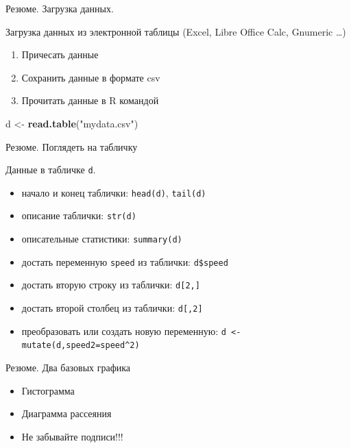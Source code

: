 \documentclass[ignorenonframetext,]{beamer}
\newenvironment{Shaded}{\begin{snugshade}}{\end{snugshade}}
\newcommand{\KeywordTok}[1]{\textcolor[rgb]{0.13,0.29,0.53}{\textbf{{#1}}}}
\newcommand{\StringTok}[1]{\textcolor[rgb]{0.31,0.60,0.02}{{#1}}}
\newcommand{\NormalTok}[1]{{#1}}
\begin{document}
\begin{frame}[fragile]{Резюме. Загрузка данных.}

Загрузка данных из электронной таблицы (Excel, Libre Office Calc,
Gnumeric \ldots{})

\begin{enumerate}
\def\labelenumi{\arabic{enumi}.}
\item
  Причесать данные
\item
  Сохранить данные в формате csv
\item
  Прочитать данные в R командой
\end{enumerate}

\begin{Shaded}
\begin{Highlighting}[]
\NormalTok{d <-}\StringTok{ }\KeywordTok{read.table}\NormalTok{(}\StringTok{"mydata.csv"}\NormalTok{)}
\end{Highlighting}
\end{Shaded}

\end{frame}

\begin{frame}{Резюме. Поглядеть на табличку}

Данные в табличке \texttt{d}.

\begin{itemize}
\itemsep1pt\parskip0pt
\item
  начало и конец таблички: \texttt{head(d)}, \texttt{tail(d)}
\item
  описание таблички: \texttt{str(d)}
\item
  описательные статистики: \texttt{summary(d)}
\item
  достать переменную \texttt{speed} из таблички: \texttt{d\$speed}
\item
  достать вторую строку из таблички: \texttt{d{[}2,{]}}
\item
  достать второй столбец из таблички: \texttt{d{[},2{]}}
\item
  преобразовать или создать новую переменную:
  \texttt{d \textless{}- mutate(d,speed2=speed\^{}2)}
\end{itemize}

\end{frame}

\begin{frame}{Резюме. Два базовых графика}

\begin{itemize}
\item
  Гистограмма
\item
  Диаграмма рассеяния
\item
  Не забывайте подписи!!!
\end{itemize}

\end{frame}
\end{document}
